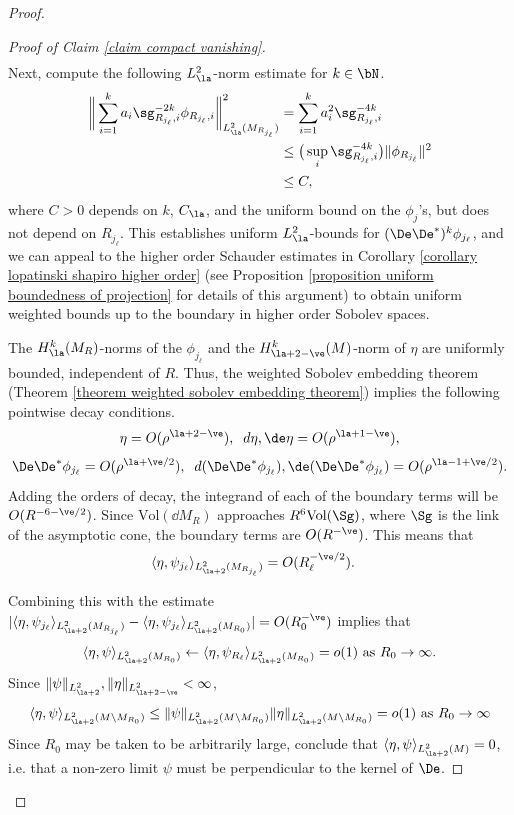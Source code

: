\documentclass[hidelinks, 12pt, oneside, reqno]{amsart}
\begin{document}
\begin{proof}
\begin{proof}[Proof of Claim \ref{claim compact vanishing}]
\begin{align*}
    \end{align*}
    Next, compute the following $L^2_\la$-norm estimate for $k \in \bN$.  
    \begin{align*}
    \bigg\| \sum_{i=1}^k a_i\sg_{R_{j_\ell},i}^{-2k} \phi_{R_{j_\ell}, i} \bigg\|_{L^2_\la (M_{R_{j_\ell}})}^2 &= \sum_{i=1}^k a_i^2 \sg_{R_{j_\ell},i}^{-4k} \\
    &\le \big( \sup_i \sg_{R_{j_\ell},i}^{-4k} \big) \|\phi_{R_{j_\ell}}\|^2 \\
    &\le C,
    \end{align*}
    where $C>0$ depends on $k$, $C_\la$, and the uniform bound on the $\phi_j$'s, but does not depend on $R_{j_\ell}$. This establishes uniform $L^2_\la$-bounds for $(\De \De^*)^k \phi_{j_\ell}$, and we can appeal to the higher order Schauder estimates in Corollary \ref{corollary lopatinski shapiro higher order} (see Proposition \ref{proposition uniform boundedness of projection} for details of this argument) to obtain uniform weighted bounds up to the boundary in higher order Sobolev spaces. 
    
    The $H^k_{\la}(M_R)$-norms of the $\phi_{j_\ell}$ and the $H^k_{\la +2 - \ve}(M)$-norm of $\eta$ are uniformly bounded, independent of $R$. Thus, the weighted Sobolev embedding theorem (Theorem \ref{theorem weighted sobolev embedding theorem}) implies the following pointwise decay conditions.
    \[
    \eta = O(\rho^{\la + 2 - \ve }), \;\;d\eta, \de \eta = O(\rho^{\la + 1 - \ve }),
    \]
    \[
    \De \De^* \phi_{j_\ell} = O(\rho^{\la + \ve/2}), \;\;d(\De \De^* \phi_{j_\ell}), \de(\De \De^* \phi_{j_\ell}) = O(\rho^{\la -1 +\ve/2 }).
    \]
    Adding the orders of decay, the integrand of each of the boundary terms will be $O(R^{-6-\ve/2})$. Since $\mathrm{Vol}(\dd M_R)$ approaches $R^6\mathrm{Vol}(\Sg)$, where $\Sg$ is the link of the asymptotic cone, the boundary terms are $O(R^{-\ve})$. This means that
    \begin{align*}
        \langle \eta, \psi_{j_\ell} \rangle_{L^2_{\la + 2}(M_{R_{j_\ell}})} &= O(R_\ell^{-\ve/2}).
    \end{align*}
    
    Combining this with the estimate $| \langle \eta, \psi_{j_\ell} \rangle_{L^2_{\la + 2}(M_{R_{j_\ell}})} - \langle \eta, \psi_{j_\ell} \rangle_{L^2_{\la + 2}(M_{R_0})}| = O(R_0^{-\ve})$ implies that 
    \[
    \langle \eta, \psi \rangle_{L^2_{\la + 2}(M_{R_0})} \leftarrow \langle \eta, \psi_{R_\ell} \rangle_{L^2_{\la + 2}(M_{R_0})} = o(1) \text{ as } R_0 \rightarrow \infty. 
    \]
    Since $\|\psi\|_{L^2_{\la + 2}}, \|\eta\|_{L^2_{\la + 2 - \ve}} < \infty$,
    \[
    \langle \eta, \psi \rangle_{L^2_{\la + 2}(M\setminus M_{R_0})} \le \|\psi\|_{L^2_{\la + 2} (M \setminus M_{R_0})} \|\eta\|_{L^2_{\la + 2}(M \setminus M_{R_0})} = o(1) \text{ as } R_0 \rightarrow \infty
    \]
    Since $R_0$ may be taken to be arbitrarily large, conclude that $\langle \eta, \psi \rangle_{L^2_{\la + 2}(M)} = 0$, i.e. that a non-zero limit $\psi$ must be perpendicular to the kernel of $\De$. 


\end{proof}
\end{proof}
\end{document}
